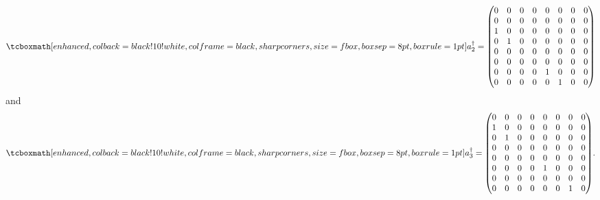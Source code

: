 \begin{eqnarray}
    \label{eq:creation-2}
    \eqbox{
    a_{2}^{\dagger} = 
    \begin{pmatrix}
        0 & 0 & 0 & 0 & 0 & 0 & 0 & 0 \\
        0 & 0 & 0 & 0 & 0 & 0 & 0 & 0 \\
        1 & 0 & 0 & 0 & 0 & 0 & 0 & 0 \\
        0 & 1 & 0 & 0 & 0 & 0 & 0 & 0 \\
        0 & 0 & 0 & 0 & 0 & 0 & 0 & 0 \\
        0 & 0 & 0 & 0 & 0 & 0 & 0 & 0 \\
        0 & 0 & 0 & 0 & 1 & 0 & 0 & 0 \\
        0 & 0 & 0 & 0 & 0 & 1 & 0 & 0
    \end{pmatrix}
}
\end{eqnarray}
and 
\begin{eqnarray}
    \label{eq:creation-3}
    \eqbox{
    a_{3}^{\dagger} = 
    \begin{pmatrix}
        0 & 0 & 0 & 0 & 0 & 0 & 0 & 0 \\
        1 & 0 & 0 & 0 & 0 & 0 & 0 & 0 \\
        0 & 1 & 0 & 0 & 0 & 0 & 0 & 0 \\
        0 & 0 & 0 & 0 & 0 & 0 & 0 & 0 \\
        0 & 0 & 0 & 0 & 0 & 0 & 0 & 0 \\
        0 & 0 & 0 & 0 & 1 & 0 & 0 & 0 \\
        0 & 0 & 0 & 0 & 0 & 0 & 0 & 0 \\
        0 & 0 & 0 & 0 & 0 & 0 & 1 & 0
    \end{pmatrix}
}
.\end{eqnarray}





